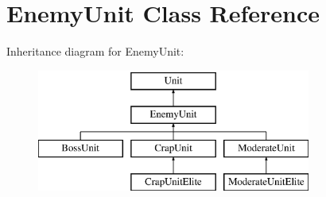 \hypertarget{class_enemy_unit}{}\section{Enemy\+Unit Class Reference}
\label{class_enemy_unit}
Inheritance diagram for Enemy\+Unit\+:\begin{figure}[H]
\begin{center}
\leavevmode
\includegraphics[height=4.000000cm]{class_enemy_unit}
\end{center}
\end{figure}
